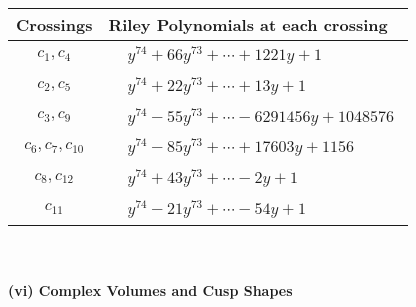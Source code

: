 \documentclass[1p]{elsarticle_modified}
\theoremstyle{definition}
\begin{document}
\begin{tabular}{m{50pt}|m{274pt}}
Crossings & \hspace{64pt}Riley Polynomials at each crossing \\
\hline $$\begin{aligned}c_{1},c_{4}\end{aligned}$$&$\begin{aligned}
&y^{74}+66 y^{73}+\cdots+1221 y+1
\end{aligned}$\\
\hline $$\begin{aligned}c_{2},c_{5}\end{aligned}$$&$\begin{aligned}
&y^{74}+22 y^{73}+\cdots+13 y+1
\end{aligned}$\\
\hline $$\begin{aligned}c_{3},c_{9}\end{aligned}$$&$\begin{aligned}
&y^{74}-55 y^{73}+\cdots-6291456 y+1048576
\end{aligned}$\\
\hline $$\begin{aligned}c_{6},c_{7},c_{10}\end{aligned}$$&$\begin{aligned}
&y^{74}-85 y^{73}+\cdots+17603 y+1156
\end{aligned}$\\
\hline $$\begin{aligned}c_{8},c_{12}\end{aligned}$$&$\begin{aligned}
&y^{74}+43 y^{73}+\cdots-2 y+1
\end{aligned}$\\
\hline $$\begin{aligned}c_{11}\end{aligned}$$&$\begin{aligned}
&y^{74}-21 y^{73}+\cdots-54 y+1
\end{aligned}$\\
\hline
\end{tabular}\\~\\
\newpage\flushleft \textbf{(vi) Complex Volumes and Cusp Shapes}
\end{document}
